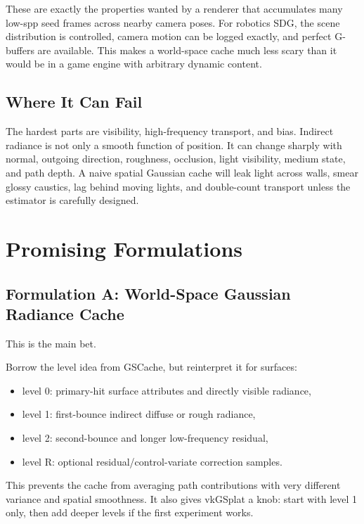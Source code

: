 \documentclass[11pt]{article}
\begin{document}
These are exactly the properties wanted by a renderer that accumulates
many low-spp seed frames across nearby camera poses. For robotics SDG, the
scene distribution is controlled, camera motion can be logged exactly, and
perfect G-buffers are available. This makes a world-space cache much less scary
than it would be in a game engine with arbitrary dynamic content.

\subsection{Where It Can Fail}

The hardest parts are visibility, high-frequency transport, and bias.
Indirect radiance is not only a smooth function of position. It can change
sharply with normal, outgoing direction, roughness, occlusion, light visibility,
medium state, and path depth. A naive spatial Gaussian cache will leak light
across walls, smear glossy caustics, lag behind moving lights, and double-count
transport unless the estimator is carefully designed.

\section{Promising Formulations}

\subsection{Formulation A: World-Space Gaussian Radiance Cache}

This is the main bet.

Borrow the level idea from GSCache, but reinterpret it for surfaces:

\begin{itemize}
  \item level 0: primary-hit surface attributes and directly visible radiance,
  \item level 1: first-bounce indirect diffuse or rough radiance,
  \item level 2: second-bounce and longer low-frequency residual,
  \item level R: optional residual/control-variate correction samples.
\end{itemize}

This prevents the cache from averaging path contributions with very different
variance and spatial smoothness. It also gives vkGSplat a knob: start with
level 1 only, then add deeper levels if the first experiment works.
\end{document}
